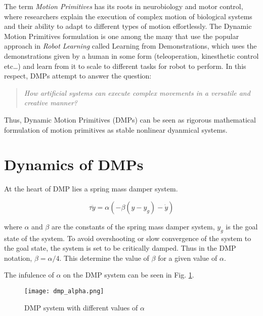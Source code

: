 The term \textit{Motion Primitives} has its roots in neurobiology and motor control, where researchers
explain the execution of complex motion of biological systems and their ability to adapt to different types of motion effortlessly.
The Dynamic Motion Primitives formulation is one among the many that use the popular approach in \textit{Robot Learning} called Learning from Demonstrations, which uses the demonstrations given by a 
human in some form (teleoperation, kinesthetic control etc\dots) and learn from it to scale to different tasks for robot to perform.
In this respect, DMPs attempt to answer the question:

\begin{quote}
    \centering
    \textit{How artificial systems can execute
complex movements in a versatile and creative manner?\cite{saveriano2021dynamic}}
\end{quote}

Thus, Dynamic Motion Primitives (DMPs) can be seen as rigorous mathematical formulation of motion primitives as stable nonlinear dyanmical systems.

\section{Dynamics of DMPs}

At the heart of DMP lies a spring mass damper system.

\begin{equation}
    \tau \ddot{y} = \alpha \left( -\beta \left( y - y_g \right) - \dot{y} \right)
    \label{eq:dmp_equation}
\end{equation}

where $\alpha$ and $\beta$ are the constants of the spring mass damper system, $y_g$ is the goal state of the system. To avoid overshooting or slow convergence of the system to the goal state,
the system is set to be critically damped. Thus in the DMP notation, $\beta=\alpha/4$. This determine the value of $\beta$ for a given value of $\alpha$.

The infulence of $\alpha$ on the DMP system can be seen in Fig. \ref{fig:dmp_alpha_influence}.

\begin{figure}[h]
    \centering
    \texttt{[image: dmp\_alpha.png]}
    \caption{DMP system with different values of $\alpha$} %
    \label{fig:dmp_alpha_influence}
\end{figure}

